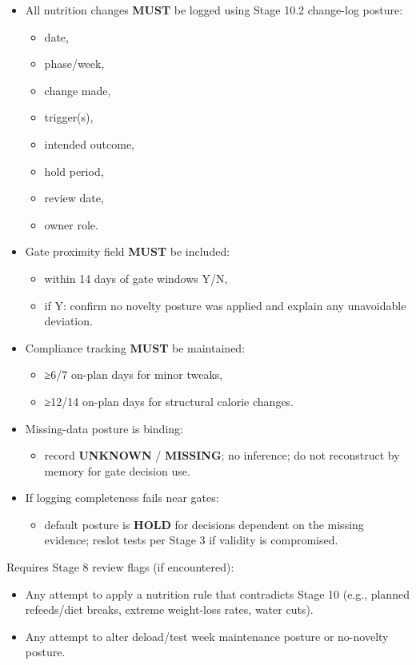 \documentclass[10pt]{article}
\begin{document}
\begin{itemize}
\item All nutrition changes \textbf{MUST} be logged using Stage 10.2 change-log posture:
\begin{itemize}
\item date,
\item phase/week,
\item change made,
\item trigger(s),
\item intended outcome,
\item hold period,
\item review date,
\item owner role.
\end{itemize}
\item Gate proximity field \textbf{MUST} be included:
\begin{itemize}
\item within 14 days of gate windows Y/N,
\item if Y: confirm no novelty posture was applied and explain any unavoidable deviation.
\end{itemize}
\item Compliance tracking \textbf{MUST} be maintained:
\begin{itemize}
\item ≥6/7 on-plan days for minor tweaks,
\item ≥12/14 on-plan days for structural calorie changes.
\end{itemize}
\item Missing-data posture is binding:
\begin{itemize}
\item record \textbf{UNKNOWN} / \textbf{MISSING}; no inference; do not reconstruct by memory for gate decision use.
\end{itemize}
\item If logging completeness fails near gates:
\begin{itemize}
\item default posture is \textbf{HOLD} for decisions dependent on the missing evidence; reslot tests per Stage 3 if validity is compromised.
\end{itemize}
\end{itemize}

Requires Stage 8 review flags (if encountered):

\begin{itemize}
\item Any attempt to apply a nutrition rule that contradicts Stage 10 (e.g., planned refeeds/diet breaks, extreme weight-loss rates, water cuts).
\item Any attempt to alter deload/test week maintenance posture or no-novelty posture.
\end{itemize}
\end{document}
